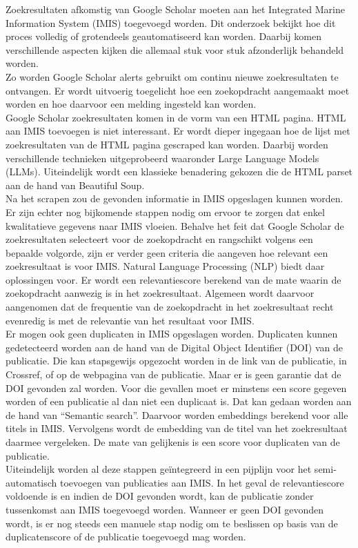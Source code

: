 Zoekresultaten afkomstig van Google Scholar moeten aan het Integrated Marine Information System (IMIS) toegevoegd worden. Dit onderzoek bekijkt hoe dit proces volledig of grotendeels geautomatiseerd kan worden. Daarbij komen verschillende aspecten kijken die allemaal stuk voor stuk afzonderlijk behandeld worden.\\
Zo worden Google Scholar alerts gebruikt om continu nieuwe zoekresultaten te ontvangen. Er wordt uitvoerig toegelicht hoe een zoekopdracht aangemaakt moet worden en hoe daarvoor een melding ingesteld kan worden.\\
Google Scholar zoekresultaten komen in de vorm van een HTML pagina. HTML aan IMIS toevoegen is niet interessant. Er wordt dieper ingegaan hoe de lijst met zoekresultaten van de HTML pagina gescraped kan worden. Daarbij worden verschillende technieken uitgeprobeerd waaronder Large Language Models (LLMs). Uiteindelijk wordt een klassieke benadering gekozen die de HTML parset aan de hand van Beautiful Soup.\\
Na het scrapen zou de gevonden informatie in IMIS opgeslagen kunnen worden. Er zijn echter nog bijkomende stappen nodig om ervoor te zorgen dat enkel kwalitatieve gegevens naar IMIS vloeien.
Behalve het feit dat Google Scholar de zoekresultaten selecteert voor de zoekopdracht en rangschikt volgens een bepaalde volgorde, zijn er verder geen criteria die aangeven hoe relevant een zoekresultaat is voor IMIS. Natural Language Processing (NLP) biedt daar oplossingen voor. Er wordt een relevantiescore berekend van de mate waarin de zoekopdracht aanwezig is in het zoekresultaat. Algemeen wordt daarvoor aangenomen dat de frequentie van de zoekopdracht in het zoekresultaat recht evenredig is met de relevantie van het resultaat voor IMIS.\\
Er mogen ook geen duplicaten in IMIS opgeslagen worden. Duplicaten kunnen gedetecteerd worden aan de hand van de Digital Object Identifier (DOI) van de publicatie. Die kan stapsgewijs opgezocht worden in de link van de publicatie, in Crossref, of op de webpagina van de publicatie. Maar er is geen garantie dat de DOI gevonden zal worden. Voor die gevallen moet er minstens een score gegeven worden of een publicatie al dan niet een duplicaat is. Dat kan gedaan worden aan de hand van ``Semantic search''. Daarvoor worden embeddings berekend voor alle titels in IMIS. Vervolgens wordt de embedding van de titel van het zoekresultaat daarmee vergeleken. De mate van gelijkenis is een score voor duplicaten van de publicatie.\\
Uiteindelijk worden al deze stappen geïntegreerd in een pijplijn voor het semi-automatisch toevoegen van publicaties aan IMIS. In het geval de relevantiescore voldoende is en indien de DOI gevonden wordt, kan de publicatie zonder tussenkomst aan IMIS toegevoegd worden. Wanneer er geen DOI gevonden wordt, is er nog steeds een manuele stap nodig om te beslissen op basis van de duplicatenscore of de publicatie toegevoegd mag worden.
